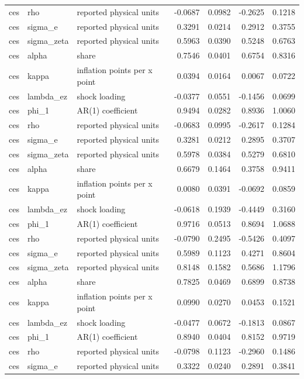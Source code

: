 \begin{tabular}{lllrrrr}
ces & rho & reported physical units & -0.0687 & 0.0982 & -0.2625 & 0.1218 \\
ces & sigma\_e & reported physical units & 0.3291 & 0.0214 & 0.2912 & 0.3755 \\
ces & sigma\_zeta & reported physical units & 0.5963 & 0.0390 & 0.5248 & 0.6763 \\
ces & alpha & share & 0.7546 & 0.0401 & 0.6754 & 0.8316 \\
ces & kappa & inflation points per x point & 0.0394 & 0.0164 & 0.0067 & 0.0722 \\
ces & lambda\_ez & shock loading & -0.0377 & 0.0551 & -0.1456 & 0.0699 \\
ces & phi\_1 & AR(1) coefficient & 0.9494 & 0.0282 & 0.8936 & 1.0060 \\
ces & rho & reported physical units & -0.0683 & 0.0995 & -0.2617 & 0.1284 \\
ces & sigma\_e & reported physical units & 0.3281 & 0.0212 & 0.2895 & 0.3707 \\
ces & sigma\_zeta & reported physical units & 0.5978 & 0.0384 & 0.5279 & 0.6810 \\
ces & alpha & share & 0.6679 & 0.1464 & 0.3758 & 0.9411 \\
ces & kappa & inflation points per x point & 0.0080 & 0.0391 & -0.0692 & 0.0859 \\
ces & lambda\_ez & shock loading & -0.0618 & 0.1939 & -0.4449 & 0.3160 \\
ces & phi\_1 & AR(1) coefficient & 0.9716 & 0.0513 & 0.8694 & 1.0688 \\
ces & rho & reported physical units & -0.0790 & 0.2495 & -0.5426 & 0.4097 \\
ces & sigma\_e & reported physical units & 0.5989 & 0.1123 & 0.4271 & 0.8604 \\
ces & sigma\_zeta & reported physical units & 0.8148 & 0.1582 & 0.5686 & 1.1796 \\
ces & alpha & share & 0.7825 & 0.0469 & 0.6899 & 0.8738 \\
ces & kappa & inflation points per x point & 0.0990 & 0.0270 & 0.0453 & 0.1521 \\
ces & lambda\_ez & shock loading & -0.0477 & 0.0672 & -0.1813 & 0.0867 \\
ces & phi\_1 & AR(1) coefficient & 0.8940 & 0.0404 & 0.8152 & 0.9719 \\
ces & rho & reported physical units & -0.0798 & 0.1123 & -0.2960 & 0.1486 \\
ces & sigma\_e & reported physical units & 0.3322 & 0.0240 & 0.2891 & 0.3841 \\

\end{tabular}
